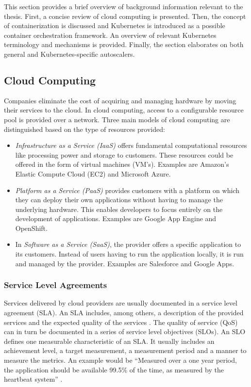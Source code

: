 This section provides a brief overview of background information relevant to the thesis. First, a concise review of cloud computing is presented. Then, the concept of containerization is discussed and Kubernetes is introduced as a possible container orchestration framework. An overview of relevant Kubernetes terminology and mechanisms is provided. Finally, the section elaborates on both general and Kubernetes-specific autoscalers.


\subsection{Cloud Computing}
Companies eliminate the cost of acquiring and managing hardware by moving their services to the cloud. In cloud computing, access to a configurable resource pool is provided over a network\citep{NIST-Could-Def}. Three main models of cloud computing are distinguished based on the type of resources provided\citep{NIST-Could-Def}: 
\begin{itemize}
    \item \textit{Infrastructure as a Service (IaaS)} offers fundamental computational resources like processing power and storage to customers. These resources could be offered in the form of virtual machines (VM's). Examples are Amazon's Elastic Compute Cloud (EC2) and Microsoft Azure.
    
    \item \textit{Platform as a Service (PaaS)} provides customers with a platform on which they can deploy their own applications without having to manage the underlying hardware. This enables developers to focus entirely on the development of applications. Examples are Google App Engine and OpenShift. 
    
    \item In \textit{Software as a Service (SaaS)}, the provider offers a specific application to its customers. Instead of users having to run the application locally, it is run and managed by the provider. Examples are Salesforce and Google Apps. 
\end{itemize}

\subsubsection{Service Level Agreements}
Services delivered by cloud providers are usually documented in a service level agreement (SLA). An SLA includes, among others, a description of the provided services and the expected quality of the services \citep{SLA2}. The quality of service (QoS) can in turn be documented in a series of service level objectives (SLOs). An SLO defines one measurable characteristic of an SLA. It usually includes an achievement level, a target measurement, a measurement period and a manner to measure the metrics. An example would be ``Measured over a one year period, the application should be available 99.5\% of the time, as measured by the heartbeat system'' \citep{SLO}\citep{SLO2}.

